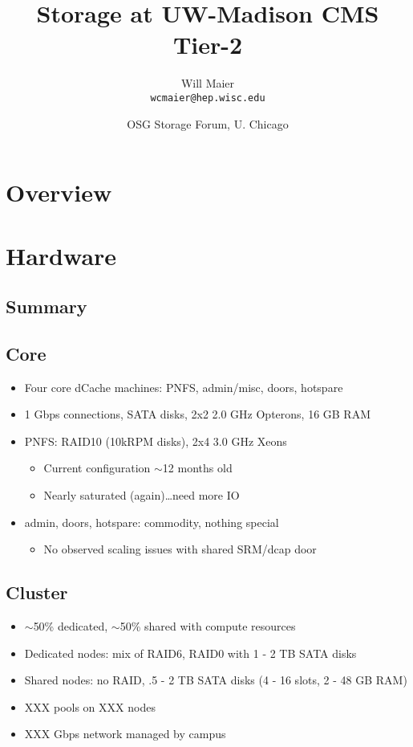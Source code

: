 \documentclass{beamer}
\title{Storage at UW-Madison CMS Tier-2}
\author[Maier]{
    Will Maier \\ 
    {\tt wcmaier@hep.wisc.edu}}
\institute[Wisconsin]{University of Wisconsin - High Energy Physics}
\date[2010.09.22]{OSG Storage Forum, U. Chicago}
\newcommand{\ca}{\ensuremath{\sim}}
\begin{document}

\begin{frame}
    \titlepage
\end{frame}

\section{Overview}
\begin{frame}
    \tableofcontents
\end{frame}

\section{Hardware}
\subsection{Summary}
\subsection{Core}
\begin{frame}
\begin{itemize}
	\item Four core dCache machines: PNFS, admin/misc, doors, hotspare
	\item 1 Gbps connections, SATA disks, 2x2 2.0 GHz Opterons, 16 GB RAM
	\item PNFS: RAID10 (10kRPM disks), 2x4 3.0 GHz Xeons
	\begin{itemize}
		\item Current configuration \ca{}12 months old
		\item Nearly saturated (again)\ldots{}need more IO
	\end{itemize}
	\item admin, doors, hotspare: commodity, nothing special
	\begin{itemize}
		\item No observed scaling issues with shared SRM/dcap door
	\end{itemize}
\end{itemize}
\end{frame}

\subsection{Cluster}
\begin{frame}
\begin{itemize}
	\item \ca{}50\% dedicated, \ca{}50\% shared with compute resources
	\item Dedicated nodes: mix of RAID6, RAID0 with 1 - 2 TB SATA disks
	\item Shared nodes: no RAID, .5 - 2 TB SATA disks (4 - 16 slots, 2 - 48 GB RAM)
	\item XXX pools on XXX nodes
	\item XXX Gbps network managed by campus
\end{itemize}
\end{frame}
\end{document}
